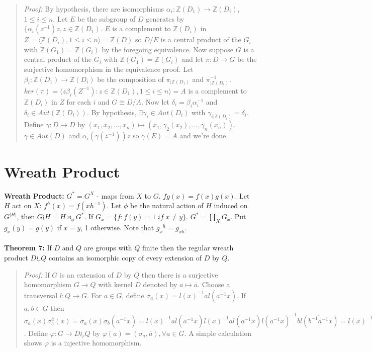 \begin{quote}
\emph{Proof:}  
By hypothesis, there are isomorphisms 
$\alpha_i : {\mathbb Z}( D_1 ) \rightarrow {\mathbb Z}( D_i )$, $1 \le i \le n$.
Let $E$ be the subgroup of $D$ generates by $\{ \alpha_i (z^{-1})z, z \in {\mathbb Z}(D_1 )$.
$E$ is a complement to 
${\mathbb Z}(D_i)$ in $Z= \langle {\mathbb Z}(D_i), 1 \le i \le n \rangle = {\mathbb Z}(D)$ so
$D/E$ is a central product of the $G_i$ with ${\mathbb Z}(G_1 ) = {\mathbb Z}(G_i )$ by
the foregoing equivalence.  Now suppose $G$ is a central product of the $G_i$ with
${\mathbb Z}(G_1 ) = {\mathbb Z}(G_i )$ and let $\pi: D \rightarrow G$ be the surjective
homomorphism in the equivalence proof.  
Let $\beta_i : {\mathbb Z}(D_1 ) \rightarrow {\mathbb Z}(D_i )$ be the composition of
$\pi_{|{\mathbb Z}(D_1 )}$ and $\pi_{|{\mathbb Z}(D_i )}^{-1}$.
$ker(\pi ) = \langle z \beta_i(Z^{-1} ): z \in {\mathbb Z}(D_1 ), 1 \le i \le n \rangle
= A$ is a complement
to ${\mathbb Z}(D_i )$ in $Z$ for each $i$ and $G \cong D/A$.  Now let 
$\delta_i = \beta_i \alpha_i^{-1}$ and $\delta_i \in Aut({\mathbb Z}(D_i ))$.  By
hypothesis, $\exists \gamma_i \in Aut( D_i )$ with $\gamma_{i | {\mathbb Z}(D_i )}= \delta_i$.
Define $\gamma : D \rightarrow D$ by 
$(x_1 , x_2 , \ldots , x_n ) \mapsto
(x_1 , \gamma_2(x_2), \ldots , \gamma_n(x_n))$.  $\gamma \in Aut(D)$ and
$\alpha_i(\gamma (z^{-1})) z$ so $\gamma(E)=A$ and we're done.
\end{quote}
\section {Wreath Product}
{\bf Wreath Product:} $G^*= G^{X}$ - maps from $X$ to $G$.  $fg(x)= f(x) g(x)$.
Let $H$ act on $X$: $f^h(x)= f(xh^{-1})$.  Let $\phi$ be the natural action of
$H$ induced on $G^{|H|}$, then $G \wr H = H \rtimes_{\phi} G^*$. If $G_x =
\{f: f(y)= 1 \; if \; x \ne y \}$.  $G^* = \prod_X G_x$.
Put $g_x (y)= g (y)$ if $x=y$, 1 otherwise.  Note that
${g_x}^h= g_{xh}$.
\\
\\
{\bf Theorem 7:} If $D$ and $Q$ are groups with $Q$ finite then the regular wreath product
$D \wr_r Q$ contains an isomorphic copy of every extension of $D$ by $Q$.
\begin{quote}
\emph{Proof:}  
If $G$ is an extension of $D$ by $Q$ then there is a surjective homomorphism
$G \rightarrow Q$ with kernel $D$ denoted by $a \mapsto {\overline a}$.
Choose a transversal $l: Q \rightarrow G$.  For $a \in G$, define 
$\sigma_a(x) = l(x)^{-1} a l({\overline {a^{-1}}} x)$.  
If $a, b \in G$ then
$
\sigma_a(x) \sigma_b^{\overline a}(x) =
\sigma_a(x) \sigma_b({\overline {a^{-1}}} x) =
l(x)^{-1} a l({\overline {a^{-1}}} x)
l(x)^{-1} a l({\overline {a^{-1}}} x)
l({\overline {a^{-1}}} x)^{-1} b l({\overline { b^{-1} a^{-1}}} x) =
l(x)^{-1} a b l({\overline { b^{-1} a^{-1}}} x) = \sigma_{ab}(x)$.  
Define $\varphi : G \rightarrow D \wr_r Q$ by 
$\varphi(a) = (\sigma_a, {\overline a}), \forall a \in G$.  A simple calculation shows
$\varphi$ is a injective homomorphism.
\end{quote}
